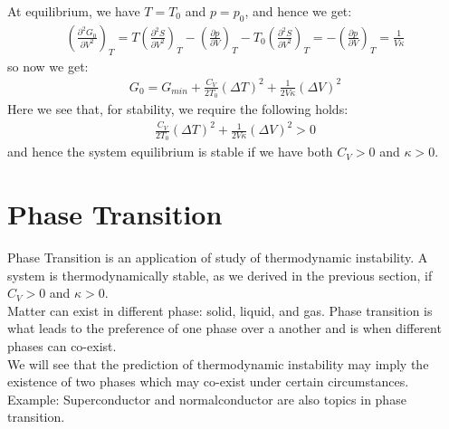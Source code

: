\documentclass[11pt,oneside]{book}
\theoremstyle{break}
\theoremstyle{break}
\newcommand{\pd}{\partial}
\newcommand{\lr}[1]{\left( #1 \right)}
\newcommand{\example}{\color{green}Example: \color{black}}
\begin{document}
At equilibrium, we have $T = T_0$ and $p= p_0$, and hence we get:
\begin{align*}
\lr{\frac{\pd^2 G_0}{\pd V^2}}_T = T \lr{\frac{\pd^2 S}{\pd V^2}}_T - \lr{\frac{\pd p}{\pd V}}_T - T_0 \lr{\frac{\pd^2 S}{\pd V^2}}_T =-\lr{\frac{\pd p}{\pd V}}_T = \frac{1}{V\kappa}
\end{align*}
so now we get:
\begin{align*}
G_0 = G_{min} + \frac{C_V}{2T_0} \lr{\Delta T}^2 + \frac{1}{2V\kappa}\lr{\Delta V}^2
\end{align*}
Here we see that, for stability, we require the following holds:
\begin{align*}
\frac{C_V}{2T_0} \lr{\Delta T}^2 + \frac{1}{2V\kappa}\lr{\Delta V}^2 >0
\end{align*}
and hence the system equilibrium is stable if we have both $C_V > 0$ and $\kappa >0$. \\

\newpage
\section[Phase Transition]{\color{red}Phase Transition\color{black}}
Phase Transition is an application of study of thermodynamic instability. A system is thermodynamically stable, as we derived in the previous section, if $C_V>0$ and $\kappa >0$. \\

Matter can exist in different phase: solid, liquid, and gas. Phase transition is what leads to the preference of one phase over a another and is when different phases can co-exist.\\

We will see that the prediction of thermodynamic instability may imply the existence of two phases which may co-exist under certain circumstances. \\

\example
Superconductor and normalconductor are also topics in phase transition.\\
\end{document}
